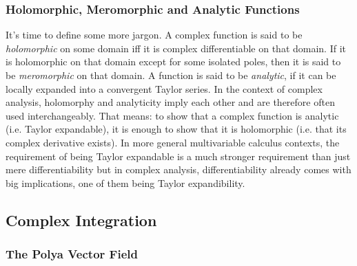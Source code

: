 \subsubsection{Holomorphic, Meromorphic and Analytic Functions}
It's time to define some more jargon. A complex function is said to be \emph{holomorphic} on some domain iff it is complex differentiable on that domain. If it is holomorphic on that domain except for some isolated poles, then it is said to be \emph{meromorphic} on that domain. A function is said to be \emph{analytic}, if it can be locally expanded into a convergent Taylor series. In the context of complex analysis, holomorphy and analyticity imply each other and are therefore often used interchangeably. That means: to show that a complex function is analytic (i.e. Taylor expandable), it is enough to show that it is holomorphic (i.e. that its complex derivative exists). In more general multivariable calculus contexts, the requirement of being Taylor expandable is a much stronger requirement than just mere differentiability but in complex analysis, differentiability already comes with big implications, one of them being Taylor expandibility.







\subsection{Complex Integration}





\subsubsection{The Polya Vector Field}

